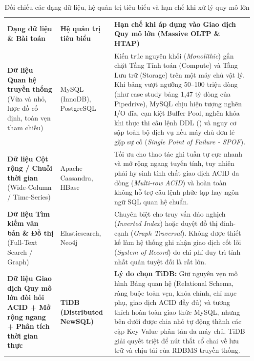 \begin{table}[H]
\centering
\caption{Đối chiếu các dạng dữ liệu, hệ quản trị tiêu biểu và hạn chế khi xử lý quy mô lớn}
\label{tab:so_sanh_he_quan_tri}
\bangfont
\begin{tabularx}{\linewidth}{@{}>{\raggedright\arraybackslash}p{3.8cm}>{\raggedright\arraybackslash}p{2.6cm}Y@{}}
\toprule
\textbf{Dạng dữ liệu \& Bài toán} & \textbf{Hệ quản trị tiêu biểu} & \textbf{Hạn chế khi áp dụng vào Giao dịch Quy mô lớn (Massive OLTP \& HTAP)}\\
\midrule
\textbf{Dữ liệu Quan hệ truyền thống} (Vừa và nhỏ, lược đồ cố định, toàn vẹn tham chiếu) & MySQL (InnoDB), PostgreSQL & Kiến trúc nguyên khối (\textit{Monolithic}) gắn chặt Tầng Tính toán (Compute) và Tầng Lưu trữ (Storage) trên một máy chủ vật lý. Khi bảng vượt ngưỡng 50--100 triệu dòng (như case study bảng  1,47 tỷ dòng của Pipedrive), MySQL chịu hiện tượng nghẽn I/O đĩa, cạn kiệt Buffer Pool, nghẽn khóa khi thực thi câu lệnh DDL () và nguy cơ sập toàn bộ dịch vụ nếu máy chủ đơn lẻ gặp sự cố (\textit{Single Point of Failure - SPOF}).\\
\midrule
\textbf{Dữ liệu Cột rộng / Chuỗi thời gian} (Wide-Column / Time-Series) & Apache Cassandra, HBase & Tối ưu cho thao tác ghi tuần tự cực nhanh và mở rộng ngang tuyến tính, tuy nhiên phải hy sinh tính chất giao dịch ACID đa dòng (\textit{Multi-row ACID}) và hoàn toàn không hỗ trợ câu lệnh  phức tạp hay ngôn ngữ SQL quan hệ chuẩn.\\
\midrule
\textbf{Dữ liệu Tìm kiếm văn bản \& Đồ thị} (Full-Text Search / Graph) & Elasticsearch, Neo4j & Chuyên biệt cho truy vấn đảo nghịch (\textit{Inverted Index}) hoặc duyệt đồ thị đỉnh-cạnh (\textit{Graph Traversal}). Không được thiết kế làm hệ thống ghi nhận giao dịch cốt lõi (\textit{System of Record}) do chi phí duy trì tính nhất quán tuyệt đối là rất lớn.\\
\midrule
\textbf{Dữ liệu Giao dịch Quy mô lớn đòi hỏi ACID + Mở rộng ngang + Phân tích thời gian thực} & \textbf{TiDB (Distributed NewSQL)} & \textbf{Lý do chọn TiDB:} Giữ nguyên vẹn mô hình Bảng quan hệ (Relational Schema, ràng buộc toàn vẹn, khóa chính, chỉ mục phụ, giao dịch ACID đầy đủ) và tương thích hoàn toàn giao thức MySQL, nhưng bên dưới được chia nhỏ tự động thành các cặp Key-Value phân tán đa máy chủ. TiDB giải quyết triệt để nút thắt cổ chai về lưu trữ và chịu tải của RDBMS truyền thống.\\
\bottomrule
\end{tabularx}
\end{table}

